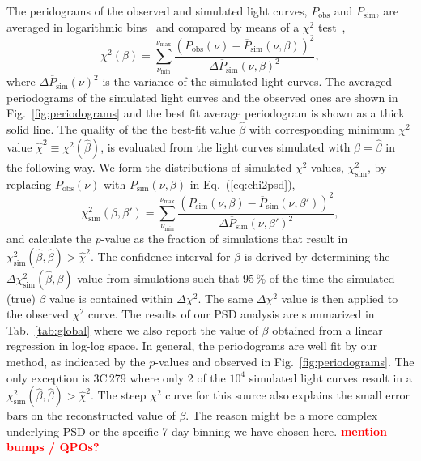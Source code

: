 \documentclass[twocolumn,linenumbers]{aastex62}
\newcommand{\todo}[1]{\textbf{\textcolor{red}{#1}}}
\begin{document}
The peridograms of the observed and simulated light curves, ${P}_\mathrm{obs}$ and ${P}_\mathrm{sim}$, are averaged in logarithmic bins~\citep{1993MNRAS.261..612P} and compared by means of a $\chi^2$ test~\citep{2014MNRAS.445..437M},
\begin{equation}
    \chi^2(\beta) = \sum_{\nu_\mathrm{min}}^{\nu_\mathrm{max}}\frac{(P_\mathrm{obs}(\nu) - \overline{P}_\mathrm{sim}(\nu,\beta))^2}{\Delta\overline{P}_\mathrm{sim}(\nu,\beta)^2},\label{eq:chi2psd}
\end{equation}
where $\Delta\overline{P}_\mathrm{sim}(\nu)^2$ is the variance of the simulated light curves.
The averaged periodograms of the simulated light curves and the observed ones are shown in Fig.~\ref{fig:periodograms} and the best fit average periodogram is shown as a thick solid line. 
The quality of the the best-fit value $\hat\beta$ with corresponding minimum $\chi^2$ value $\hat\chi^2\equiv\chi^2(\hat\beta)$, is evaluated from the light curves simulated with $\beta = \hat\beta$ in the following way. We form the distributions of simulated $\chi^2$ values, $\chi^2_\mathrm{sim}$, by replacing $P_\mathrm{obs}(\nu)$ with $P_\mathrm{sim}(\nu,\beta)$ in Eq.~(\ref{eq:chi2psd}),
\begin{equation}
    \chi^2_\mathrm{sim}(\beta,\beta') = \sum_{\nu_\mathrm{min}}^{\nu_\mathrm{max}}\frac{(P_\mathrm{sim}(\nu,\beta) - \overline{P}_\mathrm{sim}(\nu,\beta'))^2}{\Delta\overline{P}_\mathrm{sim}(\nu,\beta')^2},\label{eq:chi2psd_sim}
\end{equation}
and calculate the $p$-value as the  fraction of simulations that result in $\chi^2_\mathrm{sim}(\hat\beta,\hat\beta) > \hat\chi^2$.
The confidence interval for $\hat\beta$ is derived by determining the $\Delta\chi^2_\mathrm{sim}(\hat{\beta},\beta)$ value from simulations such that 95\,\% of the time the simulated (true) $\beta$ value is contained within $\Delta\chi^2$. 
The same $\Delta\chi^2$ value is then applied to the observed $\chi^2$ curve.
The results of our PSD analysis are summarized in Tab.~\ref{tab:global} where we also report the value of $\beta$ obtained from a linear regression in log-log space. 
In general, the periodograms are well fit by our method, as indicated by the $p$-values and observed in Fig.~\ref{fig:periodograms}. 
The only exception is 3C\,279 where only 2 of the $10^4$ simulated light curves result in a $\chi^2_\mathrm{sim}(\hat\beta,\hat\beta) > \hat\chi^2$.
The steep $\chi^2$ curve for this source also explains the small error bars on the reconstructed value of $\beta$.
The reason might be a more complex underlying PSD or the specific 7 day binning we have chosen here. 
\todo{mention bumps / QPOs?}
\end{document}
